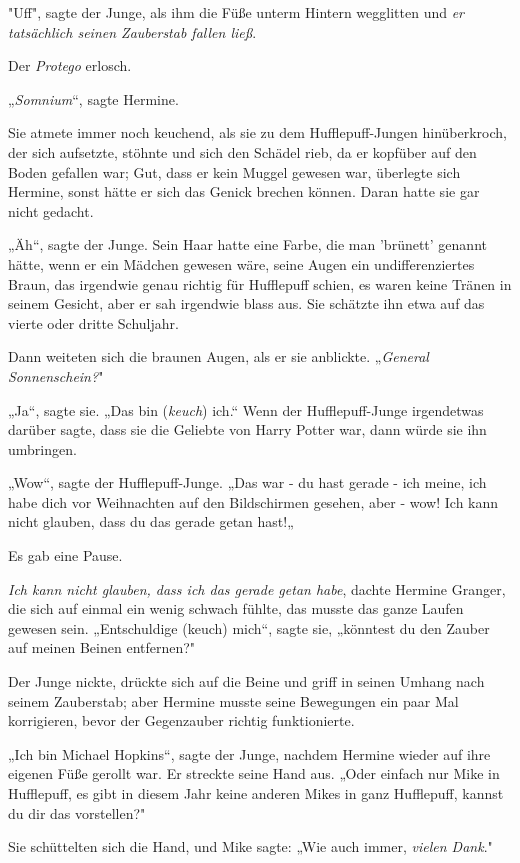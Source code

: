 {"Uff", sagte der Junge, als ihm die Füße unterm Hintern wegglitten und \emph{er tatsächlich seinen Zauberstab fallen ließ}.

Der \emph{Protego} erlosch.

„\emph{Somnium}“, sagte Hermine.

Sie atmete immer noch keuchend, als sie zu dem Hufflepuff-Jungen hinüberkroch, der sich aufsetzte, stöhnte und sich den Schädel rieb, da er kopfüber auf den Boden gefallen war; Gut, dass er kein Muggel gewesen war, überlegte sich Hermine, sonst hätte er sich das Genick brechen können. Daran hatte sie gar nicht gedacht.

„Äh“, sagte der Junge. Sein Haar hatte eine Farbe, die man 'brünett' genannt hätte, wenn er ein Mädchen gewesen wäre, seine Augen ein undifferenziertes Braun, das irgendwie genau richtig für Hufflepuff schien, es waren keine Tränen in seinem Gesicht, aber er sah irgendwie blass aus. Sie schätzte ihn etwa auf das vierte oder dritte Schuljahr.

Dann weiteten sich die braunen Augen, als er sie anblickte. „\emph{General Sonnenschein?}"

„Ja“, sagte sie. „Das bin (\emph{keuch}) ich.“ Wenn der Hufflepuff-Junge irgendetwas darüber sagte, dass sie die Geliebte von Harry Potter war, dann würde sie ihn umbringen.

„Wow“, sagte der Hufflepuff-Junge. „Das war - du hast gerade - ich meine, ich habe dich vor Weihnachten auf den Bildschirmen gesehen, aber - wow! Ich kann nicht glauben, dass du das gerade getan hast!„

Es gab eine Pause.

\emph{Ich kann nicht glauben, dass ich das gerade getan habe}, dachte Hermine Granger, die sich auf einmal ein wenig schwach fühlte, das musste das ganze Laufen gewesen sein. „Entschuldige (keuch) mich“, sagte sie, „könntest du den Zauber auf meinen Beinen entfernen?"

Der Junge nickte, drückte sich auf die Beine und griff in seinen Umhang nach seinem Zauberstab; aber Hermine musste seine Bewegungen ein paar Mal korrigieren, bevor der Gegenzauber richtig funktionierte.

„Ich bin Michael Hopkins“, sagte der Junge, nachdem Hermine wieder auf ihre eigenen Füße gerollt war. Er streckte seine Hand aus. „Oder einfach nur Mike in Hufflepuff, es gibt in diesem Jahr keine anderen Mikes in ganz Hufflepuff, kannst du dir das vorstellen?"

Sie schüttelten sich die Hand, und Mike sagte: „Wie auch immer, \emph{vielen Dank}."

}
